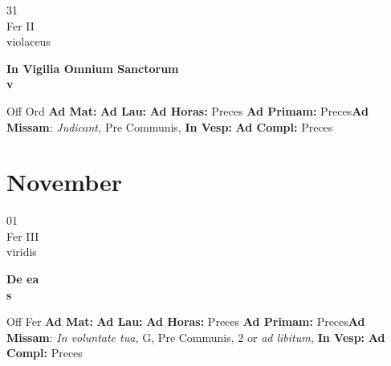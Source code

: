 \documentclass[10pt, openany]{book}
\begin{document}
    \begin{center}
        \begin{minipage}{3.5in}
            \vspace{2em}
            \begin{minipage}{0.5in}
                {\Huge 31} \\
                {\normalsize Fer II} \\
                {\normalsize violaceus}
            \end{minipage}
            \begin{minipage}{3.0in}
                \textbf{ \large In Vigilia Omnium Sanctorum \\
                \textnormal{\normalsize v}} \\ 
            \end{minipage}
            \begin{justify}Off Ord
                \textbf{Ad Mat: }
                \textbf{Ad Lau: }
                \textbf{Ad Horas: }Preces
                \textbf{Ad Primam: }Preces\textbf{Ad Missam}: \textit{Judicant,} Pre Communis,  
                \textbf{In Vesp: }
                \textbf{Ad Compl: }Preces
            \end{justify}
        \end{minipage}
    \end{center}

    \chapter{November}
                    
    \begin{center}
        \begin{minipage}{3.5in}
            \vspace{2em}
            \begin{minipage}{0.5in}
                {\Huge 01} \\
                {\normalsize Fer III} \\
                {\normalsize viridis}
            \end{minipage}
            \begin{minipage}{3.0in}
                \textbf{ \large De ea \\
                \textnormal{\normalsize s}} \\ 
            \end{minipage}
            \begin{justify}Off Fer
                \textbf{Ad Mat: }
                \textbf{Ad Lau: }
                \textbf{Ad Horas: }Preces
                \textbf{Ad Primam: }Preces\textbf{Ad Missam}: \textit{In voluntate tua,} G, Pre Communis, 2 or \textit{ad libitum,}  
                \textbf{In Vesp: }
                \textbf{Ad Compl: }Preces
            \end{justify}
        \end{minipage}
    \end{center}
\end{document}
